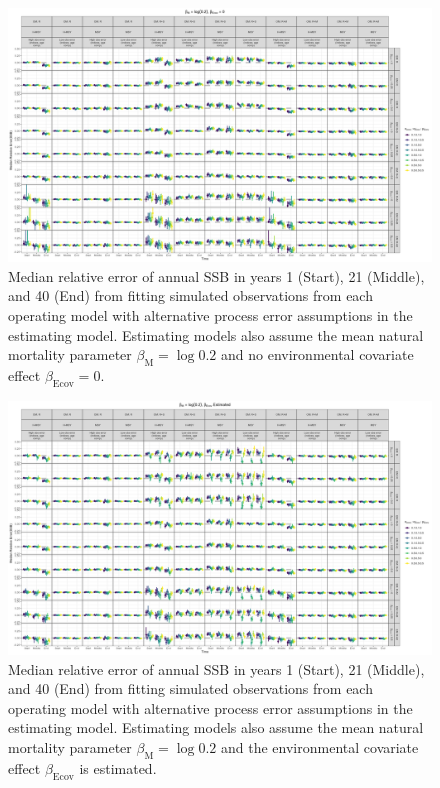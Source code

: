 \documentclass[
  12pt,
]{article}
\begin{document}
\begin{landscape}
\begin{figure}
\caption{Median relative error of annual SSB in years 1 (Start), 21 (Middle), and 40 (End) from fitting simulated observations from each operating model with alternative process error assumptions in the estimating model. Estimating models also assume the mean natural mortality parameter $\beta_\text{M} = \log 0.2$ and no environmental covariate effect $\beta_\text{Ecov} = 0$.}\label{SSB_bias_M_fixed_beta_fixed}
\begin{center}
\includegraphics[height = \textheight]{SSB_bias_all_PE_effect_M_fixed_beta_fixed.png}
\end{center}
\end{figure}
\end{landscape}

\begin{landscape}
\begin{figure}
\caption{Median relative error of annual SSB in years 1 (Start), 21 (Middle), and 40 (End) from fitting simulated observations from each operating model with alternative process error assumptions in the estimating model. Estimating models also assume the mean natural mortality parameter $\beta_\text{M} = \log 0.2$ and the environmental covariate effect $\beta_\text{Ecov}$ is estimated.}\label{SSB_bias_M_fixed_beta_estimated}
\begin{center}
\includegraphics[height = \textheight]{SSB_bias_all_PE_effect_M_fixed_beta_estimated.png}
\end{center}
\end{figure}
\end{landscape}
\end{document}
